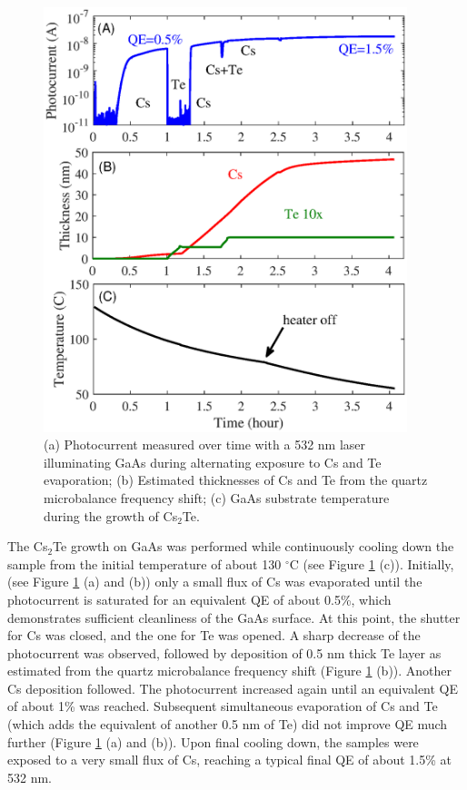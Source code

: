 \begin{figure}
    \centering
    \includegraphics[width=300pt]{figs/CsTe/growth.eps}
    \caption{(a) Photocurrent measured over time with a 532 nm laser illuminating GaAs during alternating exposure to Cs and Te evaporation; (b) Estimated thicknesses of Cs and Te from the quartz microbalance frequency shift; (c) GaAs substrate temperature during the growth of Cs$_2$Te.}
    \label{growth}
\end{figure}
The Cs$_2$Te growth on GaAs was performed while continuously cooling down the sample from the initial temperature of about 130 $^\circ$C (see Figure \ref{growth} (c)). 
Initially, (see Figure \ref{growth} (a) and (b)) only a small flux of Cs was evaporated until the photocurrent is saturated for an equivalent QE of about 0.5\%, which demonstrates sufficient cleanliness of the GaAs surface. At this point, the shutter for Cs was closed, and the one for Te was opened. A sharp decrease of the photocurrent was observed, followed by deposition of 0.5 nm thick Te layer as estimated from the quartz microbalance frequency shift (Figure \ref{growth} (b)). Another Cs deposition followed. The photocurrent increased again until an equivalent QE of about 1\% was reached. Subsequent simultaneous evaporation of Cs and Te (which adds the equivalent of another 0.5 nm of Te) did not improve QE much further (Figure \ref{growth} (a) and (b)). Upon final cooling down, the samples were exposed to a very small flux of Cs, reaching a typical final QE of about 1.5\% at 532 nm. %

